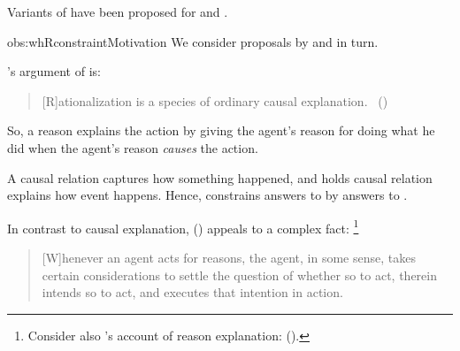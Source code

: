 \begin{note}
  \begin{observation}%
    \label{obs:whRconstraintMotivation}%
    Variants of \issueInclusion{} have been proposed for \qWhyR{} and \qHow{}.
  \end{observation}
  \begin{motivation}{obs:whRconstraintMotivation}
    We consider proposals by \citeauthor{Davidson:1963aa} and \citeauthor{Hieronymi:2011aa} in turn.
    \medskip

    \noindent%
    \citeauthor{Davidson:1963aa}'s argument of  is:
    \begin{quote}
      [R]ationalization is a species of ordinary causal explanation.%
      \mbox{ }\hfill\mbox{(\citeyear[685]{Davidson:1963aa})}
    \end{quote}
    So, a reason explains the action by giving the agent's reason for doing what he did when the agent's reason \emph{causes} the action.

    A causal relation captures how something happened, and \citeauthor{Davidson:1963aa} holds causal relation explains how event happens.
    Hence, \citeauthor{Davidson:1963aa} constrains answers to \qWhyR{} by answers to \qHowR{}.
    \medskip

    \noindent%
    In contrast to causal explanation, \citeauthor{Hieronymi:2011aa} (\citeyear{Hieronymi:2011aa}) appeals to a complex fact:%
    \footnote{
      Consider also \citeauthor{Harman:1973ww}'s account of reason explanation:
       (\citeyear[52]{Harman:1973ww}).
    }
    \begin{quote}
      [W]henever an agent acts for reasons, the agent, in some sense, takes certain considerations to settle the question of whether so to act, therein intends so to act, and executes that intention in action.


\end{quote}
\end{motivation}
\end{note}
